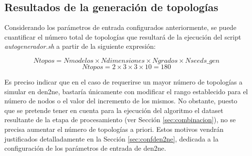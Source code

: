 \vspace{3mm}

\subsection{Resultados de la generación de topologías}
\label{sec:gentopo}

Considerando los parámetros de entrada configurados anteriormente, se puede cuantificar el número total de topologías que resultará de la ejecución del script \textit{autogenerador.sh} a partir de la siguiente expresión:

    \[\textit{Ntopos} = \textit{Nmodelos} \times \textit{Ndimensiones}
    \times \textit{Ngrados} \times \textit{Nseeds\_gen}\]
    \[\textit{Ntopos} = 2 \times 3 \times 3 \times 10 = 180\]

\vspace{3mm}

Es preciso indicar que en el caso de requerirse un mayor número de topologías a simular en \gls{den2ne}, bastaría únicamente con modificar el rango establecido para el número de nodos o el valor del incremento de los mismos. No obstante, puesto que se pretende tener en cuenta para la ejecución del algoritmo el dataset resultante de la etapa de procesamiento (ver Sección \ref{sec:combinacion}), no se precisa aumentar el número de topologías a priori. Estos motivos vendrán justificados detalladamente en la Sección \ref{sec:confden2ne}, dedicada a la configuración de los parámetros de entrada de \gls{den2ne}.


